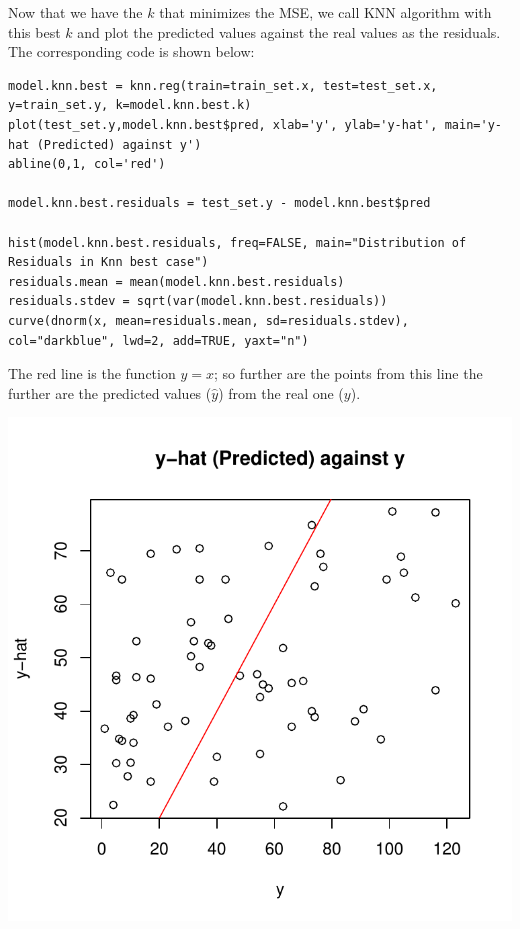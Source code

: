\documentclass[]{report}
\begin{document}
Now that we have the $k$ that minimizes the MSE, we call KNN algorithm with this best $k$ and plot the predicted values against the real values as the residuals. The corresponding code is shown below:

\begin{lstlisting}
model.knn.best = knn.reg(train=train_set.x, test=test_set.x, y=train_set.y, k=model.knn.best.k)
plot(test_set.y,model.knn.best$pred, xlab='y', ylab='y-hat', main='y-hat (Predicted) against y')
abline(0,1, col='red')

model.knn.best.residuals = test_set.y - model.knn.best$pred

hist(model.knn.best.residuals, freq=FALSE, main="Distribution of Residuals in Knn best case")
residuals.mean = mean(model.knn.best.residuals)
residuals.stdev = sqrt(var(model.knn.best.residuals))
curve(dnorm(x, mean=residuals.mean, sd=residuals.stdev), col="darkblue", lwd=2, add=TRUE, yaxt="n")
\end{lstlisting}

The red line is the function $y=x$; so further are the points from this line the further are the predicted values ($\hat{y}$) from the real one ($y$).

\begin{center}
	\includegraphics[width=0.9\linewidth]{Figures/knn_predicted_test.pdf}
	\label{fig:knn_predicted_test}
\end{center}
\end{document}
